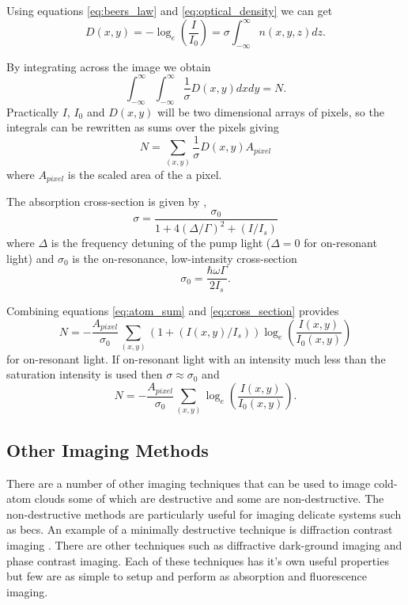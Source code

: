 Using equations \ref{eq:beers_law} and \ref{eq:optical_density} we can get
\begin{equation}
D(x, y) = -\log_e(\frac{I}{I_0}) = \sigma \int_{-\infty}^{\infty} n(x, y, z) dz.
\end{equation}

By integrating across the image we obtain
\begin{equation}
\int_{-\infty}^{\infty} \int_{-\infty}^{\infty} \frac{1}{\sigma}D(x, y) dx dy = N.
\end{equation}
Practically $I$, $I_0$ and $D(x, y)$ will be two dimensional arrays of pixels, so the integrals can be rewritten as sums over the pixels giving
\begin{equation}\label{eq:atom_sum}
N = \sum_{(x, y)} \frac{1}{\sigma}D(x, y)A_{pixel}
\end{equation}
where $A_{pixel}$ is the scaled area of the a pixel.

The absorption cross-section is given by \cite{steck_rubidium_2001},
\begin{equation}\label{eq:cross_section}
\sigma = \frac{\sigma_0}{1+4(\Delta/\Gamma)^2 + (I/I_s)}
\end{equation}
where $\Delta$ is the frequency detuning of the pump light ($\Delta=0$ for on-resonant light) and $\sigma_0$ is the on-resonance, low-intensity  cross-section
\begin{equation}
\sigma_0 = \frac{\hbar\omega\Gamma}{2I_s}.
\end{equation}

Combining equations \ref{eq:atom_sum} and \ref{eq:cross_section} provides
\begin{equation}
N = -\frac{A_{pixel}}{\sigma_0} \sum_{(x, y)} (1+(I(x, y)/I_s)) \log_e\left(\frac{I(x, y)}{I_0(x, y)}\right)
\end{equation}
for on-resonant light. If on-resonant light with an intensity much less than the saturation intensity is used then $\sigma \approx \sigma_0$ and
\begin{equation}
N = -\frac{A_{pixel}}{\sigma_0} \sum_{(x, y)} \log_e\left(\frac{I(x, y)}{I_0(x, y)}\right).
\end{equation}


\subsection{Other Imaging Methods}

There are a number of other imaging techniques that can be used to image cold-atom clouds some of which are destructive and some are non-destructive. The non-destructive methods are particularly useful for imaging delicate systems such as \glspl{bec}. An example of a minimally destructive technique is diffraction contrast imaging \cite{sheludko_excited-state_2007}. There are other techniques such as diffractive dark-ground imaging\cite{gregory-orfeus_diffractive_2011} and phase contrast imaging\cite{andrews_propagation_1997}. Each of these techniques has it's own useful properties but few are as simple to setup and perform as absorption and fluorescence imaging.

